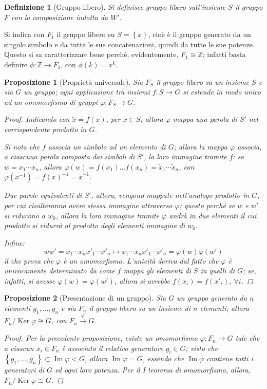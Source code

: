 \documentclass[11pt]{scrartcl}
\theoremstyle{style1}
\newtheorem{prop}{Proposizione}[section]
\newtheorem{definizione}{Definizione}[section]
\numberwithin{equation}{subsection}
\begin{document}
\begin{definizione}
	[Gruppo libero]
	Si definisce \textit{gruppo libero sull'insieme} $S$ il gruppo $F$ con la composizione indotta da $W'$.
\end{definizione}
\noindent Si indica con $F_1$ il gruppo libero su $S = \left\{ x \right\} $, cio\`e \`e il gruppo generato da un singolo simbolo e da tutte le sue concatenazioni, quindi da tutte le sue potenze.
Questo si sa caratterizzare bene perch\'e, evidentemente, $F_1 \cong \mathbb{Z}$; infatti basta definire $\phi :\mathbb{Z}\to F_1$, con $\phi (k) = x^k$.

\begin{prop}
	[Propriet\`a universale]
	Sia $F_S$ il gruppo libero su un insieme $S$ e sia $G$ un gruppo; ogni applicazione tra insiemi $f: S \to G$ si estende in modo unico ad un omomorfismo di gruppi $\varphi : F_S \to G$.
	\begin{proof} 
Indicando con $\widetilde{x}=f(x)$, per $x \in S$, allora $\varphi $ mappa una parola di $S'$ nel corrispondente prodotto in $G$.

Si nota che $f$ associa un simbolo ad un elemento di $G$; allora la mappa $\varphi $ associa, a ciascuna parola composta dai simboli di $S'$, la loro immagine tramite $f$: se $w = x_1 \cdots x_n$, allora $\varphi (w) = f(x_1) \ldots f(x_n)=\widetilde{x}_1 \cdots \widetilde{x}_n$, con $\varphi (x^{-1})=f(x)^{-1} = \widetilde{x}^{-1}$.

Due parole equivalenti di $S'$, allora, vengono mappate nell'analogo prodotto in $G$, per cui risulteranno avere stessa immagine attraverso $\varphi $; questo perch\'e se $w$ e $w'$ si riducono a $w_0$, allora la loro immagine tramite $\varphi $ andr\`a in due elementi il cui prodotto si ridurr\`a al prodotto degli elementi immagine di $w_0$.

Infine:
\[
w w'=x_1\cdots x_n x'_1\cdots x'_n\longmapsto \widetilde{x}_1 \cdots \widetilde{x}_n \widetilde{x}'_1 \cdots \widetilde{x}'_n= \varphi (w)\varphi (w')
\] 
il che prova che $\varphi $ \`e un omomorfismo.
L'unicit\`a deriva dal fatto che $\varphi $ \`e univocamente determinato da come $f$ mappa gli elementi di $S$ in quelli di $G$; se, infatti, si avesse $\varphi (w) = \varphi (w')$, allora si avrebbe $f(x_i) = f(x'_i), \ \forall i$.
	\end{proof}
\end{prop}
\begin{prop}
	[Presentazione di un gruppo]
	Sia $G$ un gruppo generato da $n$ elementi $g_1,\ldots,g_n$ e sia $F_n$ il gruppo libero su un insieme di $n$ elementi; allora $F_n / \operatorname{Ker} \varphi  \cong G$, con $F_n \stackrel{\varphi }{\longrightarrow} G$.
	\begin{proof}
		Per la precedente proposizione, esiste un omomorfismo $\varphi : F_n \to G$ tale che a ciascun $x_i \in F_n$ \`e associato il relativo generatore $g_i \in G$; visto che $\left\{ g_1,\ldots,g_n \right\} \subset \operatorname{Im} \varphi < G$, allora $\operatorname{Im} \varphi = G$, essendo che $\operatorname{Im} \varphi $ contiene tutti i generatori di $G$ ed ogni loro potenza.
		Per il I teorema di omomorfismo, allora, $F_n / \operatorname{Ker} \varphi \cong G$.
	\end{proof}
\end{prop}
\end{document}

